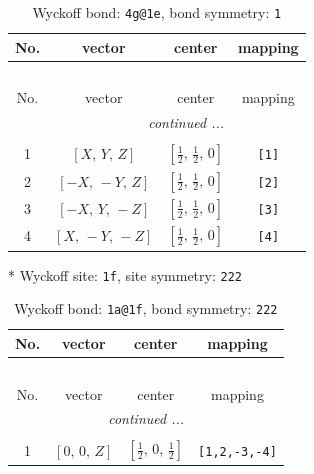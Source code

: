 \documentclass[fleqn,8pt]{jsarticle}
\begin{document}
\begin{longtable}{cccc}
\caption{Wyckoff bond: {\tt 4g@1e}, bond symmetry: {\tt 1}}
 \\
 \hline \hline
No. & vector & center & mapping \\ \hline \endfirsthead

\multicolumn{3}{l}{\tablename\ \thetable{}} \\
 \hline \hline
No. & vector & center & mapping \\ \hline \endhead

 \hline \hline
\multicolumn{3}{r}{\footnotesize\it continued ...} \\ \endfoot

 \hline \hline
\multicolumn{3}{r}{} \\ \endlastfoot

1 & $\left[ X,\, Y,\, Z \right]$ & $\left[ \frac{1}{2},\, \frac{1}{2},\, 0 \right]$ & {\tt [1]} \\ \hline
2 & $\left[ - X,\, - Y,\, Z \right]$ & $\left[ \frac{1}{2},\, \frac{1}{2},\, 0 \right]$ & {\tt [2]} \\ \hline
3 & $\left[ - X,\, Y,\, - Z \right]$ & $\left[ \frac{1}{2},\, \frac{1}{2},\, 0 \right]$ & {\tt [3]} \\ \hline
4 & $\left[ X,\, - Y,\, - Z \right]$ & $\left[ \frac{1}{2},\, \frac{1}{2},\, 0 \right]$ & {\tt [4]} \\
\end{longtable}
* Wyckoff site: {\tt 1f}, site symmetry: {\tt 222}
\renewcommand{\arraystretch}{1.2}
\begin{longtable}{cccc}
\caption{Wyckoff bond: {\tt 1a@1f}, bond symmetry: {\tt 222}}
 \\
 \hline \hline
No. & vector & center & mapping \\ \hline \endfirsthead

\multicolumn{3}{l}{\tablename\ \thetable{}} \\
 \hline \hline
No. & vector & center & mapping \\ \hline \endhead

 \hline \hline
\multicolumn{3}{r}{\footnotesize\it continued ...} \\ \endfoot

 \hline \hline
\multicolumn{3}{r}{} \\ \endlastfoot

1 & $\left[ 0,\, 0,\, Z \right]$ & $\left[ \frac{1}{2},\, 0,\, \frac{1}{2} \right]$ & {\tt [1,2,-3,-4]} \\
\end{longtable}
\end{document}
